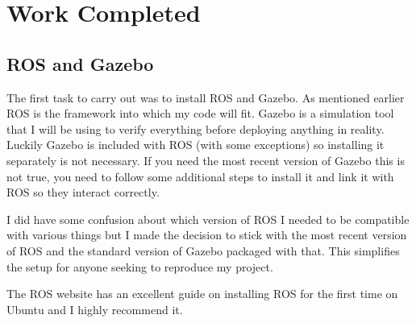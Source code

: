 \documentclass[]{../resources/final_report}
\begin{document}




\chapter{Work Completed}

\section{ROS and Gazebo}

The first task to carry out was to install ROS and Gazebo. As mentioned earlier ROS is the framework 
into which my code will fit. Gazebo is a simulation tool that I will be using to verify everything 
before deploying anything in reality. Luckily Gazebo is included with ROS (with some exceptions) so 
installing it separately is not necessary. If you need the most recent version of Gazebo this is not 
true, you need to follow some additional steps to install it and link it with ROS so they interact 
correctly.

I did have some confusion about which version of ROS I needed to be compatible with various things 
but I made the decision to stick with the most recent version of ROS and the standard version of 
Gazebo packaged with that. This simplifies the setup for anyone seeking to reproduce my project.

The ROS website\cite{melodic/installation/ubuntu} has an excellent guide on installing ROS for the 
first time on Ubuntu and I highly recommend it.


\end{document}
